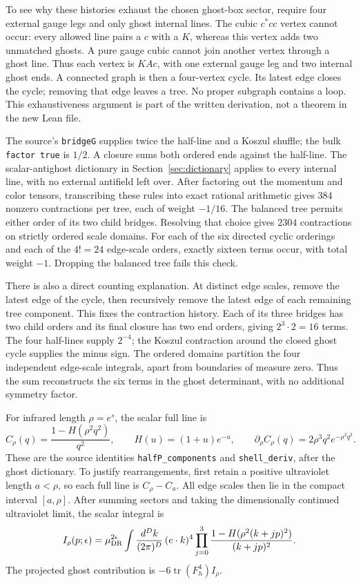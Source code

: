 \documentclass[11pt]{article}
\newcommand{\tr}{\operatorname{tr}}
\newcommand{\code}[1]{{\small\nolinkurl{#1}}}
\begin{document}
To see why these histories exhaust the chosen ghost-box sector, require
four external gauge legs and only ghost internal lines. The cubic $c^*cc$
vertex cannot occur: every allowed line pairs a $c$ with a $K$, whereas
this vertex adds two unmatched ghosts. A pure gauge cubic cannot join
another vertex through a ghost line. Thus each vertex is $KAc$, with one
external gauge leg and two internal ghost ends. A connected graph is then
a four-vertex cycle. Its latest edge closes the cycle; removing that edge
leaves a tree. No proper subgraph contains a loop. This exhaustiveness
argument is part of the written derivation, not a theorem in the new Lean
file.

The source's \code{bridgeG} supplies twice the half-line and a Koszul
shuffle; the bulk \code{factor true} is $1/2$. A closure sums both ordered
ends against the half-line. The scalar-antighost dictionary in
Section~\ref{sec:dictionary} applies to every internal line, with no external
antifield left over. After factoring out the momentum and color tensors,
transcribing these rules into exact rational arithmetic gives 384 nonzero
contractions per tree, each of weight $-1/16$.
The balanced tree permits either order of its two child bridges. Resolving
that choice gives $2304$ contractions on strictly ordered scale domains.
For each of the six directed cyclic orderings and each of the $4!=24$
edge-scale orders, exactly sixteen terms occur, with total weight $-1$.
Dropping the balanced tree fails this check.

There is also a direct counting explanation. At distinct edge scales, remove
the latest edge of the cycle, then recursively remove the latest edge of
each remaining tree component. This fixes the contraction history. Each of
its three bridges has two child orders and its final closure has two end
orders, giving $2^3\cdot2=16$ terms. The four half-lines supply $2^{-4}$;
the Koszul contraction around the closed ghost cycle supplies the minus
sign. The ordered domains partition the four independent edge-scale
integrals, apart from boundaries of measure zero. Thus the sum reconstructs
the six terms in the ghost determinant, with no additional symmetry factor.

For infrared length $\rho=e^s$, the scalar full line is
\[
 C_\rho(q)=\frac{1-H(\rho^2q^2)}{q^2},\qquad
 H(u)=(1+u)e^{-u},\qquad
 \partial_\rho C_\rho(q)=2\rho^3q^2e^{-\rho^2q^2}.
\]
These are the source identities \code{halfP_components} and
\code{shell_deriv}, after the ghost dictionary. To justify rearrangements,
first retain a positive ultraviolet length $a<\rho$, so each full line is
$C_\rho-C_a$. All edge scales then lie in the compact interval $[a,\rho]$.
After summing sectors and taking the dimensionally continued ultraviolet
limit, the scalar integral is
\begin{equation}\label{eq:box-cutoff}
 I_\rho(p;\epsilon)=\mu_{\rm DR}^{2\epsilon}
 \int\frac{d^Dk}{(2\pi)^D}\,(e\cdot k)^4
 \prod_{j=0}^3\frac{1-H(\rho^2(k+jp)^2)}{(k+jp)^2}.
\end{equation}
The projected ghost contribution is $-6\tr(F_h^4)I_\rho$.
\end{document}
